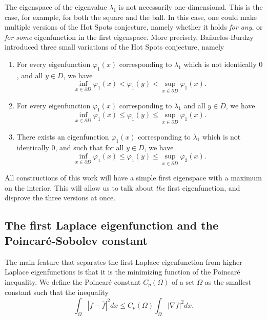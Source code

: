 The eigenspace of the eigenvalue $\lambda_1$ is not necessarily one-dimensional. This is the case, for example, for both the square and the ball. In this case, one could make multiple versions of the Hot Spots conjecture, namely whether it holds \emph{for any}, or \emph{for some} eigenfunction in the first eigenspace. More precisely, Bañuelos-Burdzy \cite{banuelos_hot_1999} introduced three small variations of the Hot Spots conjecture, namely
\begin{enumerate}
    \item[(HS1)] For every eigenfunction $\varphi_{1}(x)$ corresponding to $\lambda_1$ which is not identically $0$, and all $y \in D$, we have 
\[
\inf_{x \in \partial D} \varphi_{1}(x) < \varphi_{1}(y) < \sup_{x \in \partial D} \varphi_{1}(x).
\]

\item[(HS2)] For every eigenfunction $\varphi_{1}(x)$ corresponding to $\lambda_1$ and all $y \in D$, we have 
\[
\inf_{x \in \partial D} \varphi_{1}(x) \leq \varphi_{1}(y) \leq \sup_{x \in \partial D} \varphi_{1}(x).
\]

\item[(HS3)] There exists an eigenfunction $\varphi_{1}(x)$ corresponding to $\lambda_1$ which is not identically $0$, and such that for all $y \in D$, we have 
\[
\inf_{x \in \partial D} \varphi_{1}(x) \leq \varphi_{1}(y) \leq \sup_{x \in \partial D} \varphi_{2}(x).
\]
\end{enumerate}

All constructions of this work will have a simple first eigenspace with a maximum on the interior. This will allow us to talk about \emph{the} first eigenfunction, and disprove the three versions at once.

\subsection{The first Laplace eigenfunction and the Poincaré-Sobolev constant} \label{soincare_popolev}

The main feature that separates the first Laplace eigenfunction from higher Laplace eigenfunctions is that it is the minimizing function of the Poincaré inequality.
We define the Poincaré constant $C_p (\Omega)$ of a set $\Omega$ as the smallest constant such that the inequality
$$
\int_{\Omega}|f-\overline f|^2 dx \le C_p(\Omega) \int_{\Omega} |\nabla f|^2 dx.
$$

